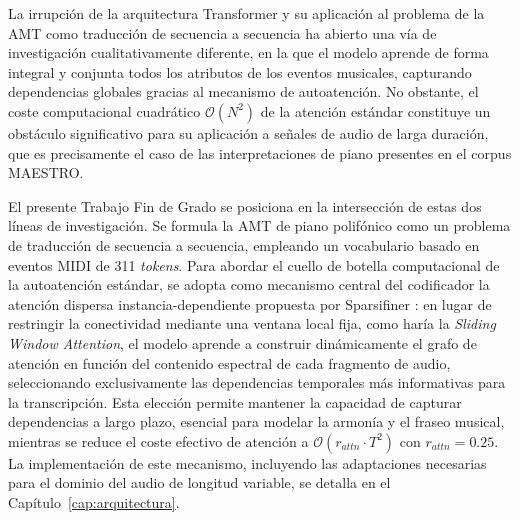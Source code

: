 La irrupción de la arquitectura Transformer y su aplicación al problema de la AMT
como traducción de secuencia a secuencia ha abierto una vía de investigación
cualitativamente diferente, en la que el modelo aprende de forma integral y conjunta todos
los atributos de los eventos musicales, capturando dependencias globales gracias al
mecanismo de autoatención. No obstante, el coste computacional cuadrático $\mathcal{O}(N^2)$
de la atención estándar constituye un obstáculo significativo para su aplicación a señales
de audio de larga duración, que es precisamente el caso de las interpretaciones de piano
presentes en el corpus MAESTRO.
 
El presente Trabajo Fin de Grado se posiciona en la intersección de estas dos líneas de
investigación. Se formula la AMT de piano polifónico como un problema de
traducción de secuencia a secuencia, empleando un vocabulario basado en eventos
MIDI de 311 \textit{tokens}. Para abordar el cuello de botella computacional de la
autoatención estándar, se adopta como mecanismo central del codificador la atención
dispersa instancia-dependiente propuesta por Sparsifiner \cite{wei2023sparsifiner}: en
lugar de restringir la conectividad mediante una ventana local fija, como haría la
\textit{Sliding Window Attention}, el modelo aprende a construir dinámicamente el grafo
de atención en función del contenido espectral de cada fragmento de audio, seleccionando
exclusivamente las dependencias temporales más informativas para la transcripción. Esta
elección permite mantener la capacidad de capturar dependencias a largo plazo, esencial
para modelar la armonía y el fraseo musical, mientras se reduce el coste efectivo de
atención a $\mathcal{O}(r_{attn} \cdot T^2)$ con $r_{attn} = 0.25$. La implementación
de este mecanismo, incluyendo las adaptaciones necesarias para el dominio del audio de
longitud variable, se detalla en el Capítulo~\ref{cap:arquitectura}.